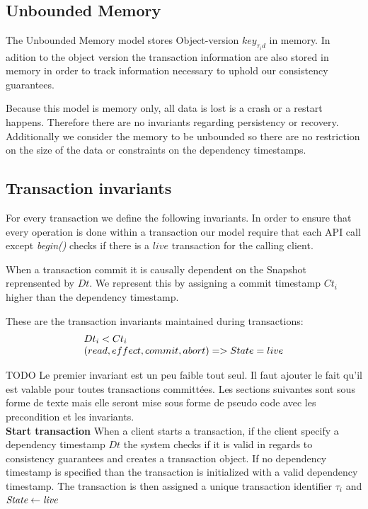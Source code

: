 \documentclass[systeme]{compas2022}
\begin{document}
\subsection{Unbounded Memory}

The Unbounded Memory model stores Object-version $key_{\tau_id}$ in memory.
In adition to the object version the transaction information are also stored in memory in order to track information necessary to uphold our consistency guarantees.

Because this model is memory only, all data is lost is a crash or a restart happens.
Therefore there are no invariants regarding persistency or recovery.
Additionally we consider the memory to be unbounded so there are no restriction on the size of the data or constraints on the dependency timestamps.

\subsection{Transaction invariants}

For every transaction we define the following invariants.
In order to ensure that every operation is done within a transaction our model require that each API call except \emph{begin()} checks if there is a $live$ transaction for the calling client.

When a transaction commit it is causally dependent on the Snapshot reprensented by $Dt$.
We represent this by assigning a commit timestamp $Ct_i$ higher than the dependency timestamp.

These are the transaction invariants maintained during transactions:
\[
  \begin{array}{lcl}
    \emph{$Dt_i < Ct_i$}\\
    \emph{$(read, effect, commit, abort) => State = live$}
  \end{array} 
\]


TODO Le premier invariant est un peu faible tout seul. Il faut ajouter le fait qu'il est valable pour toutes transactions committées. Les sections suivantes sont sous forme de texte mais elle seront mise sous forme de pseudo code avec les precondition et les invariants.\\


\textbf{Start transaction}
When a client starts a transaction, if the client specify a dependency timestamp $Dt$ the system checks if it is valid in regards to consistency guarantees and creates a transaction object.
If no dependency timestamp is specified than the transaction is initialized with a valid dependency timestamp.
The transaction is then assigned a unique transaction identifier $\tau_i$ and $\emph{State} \leftarrow \emph{live}$ \\
\end{document}
